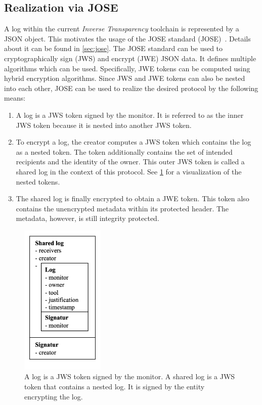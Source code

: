 \documentclass[../main.tex]{subfiles}
\begin{document}
\subsection{Realization via JOSE}
\label{sec:jose-protocol}

A log within the current \emph{Inverse Transparency} toolchain is represented by a JSON object.
This motivates the usage of the JOSE standard (JOSE)~\cite{Barnes2014}.
Details about it can be found in \cref{sec:jose}.
The JOSE standard can be used to cryptographically sign (JWS) and encrypt (JWE) JSON data.
It defines multiple algorithms which can be used.
Specifically, JWE tokens can be computed using hybrid encryption algorithms.
Since JWS and JWE tokens can also be nested into each other, JOSE can be used to realize the desired protocol by the following means:
\begin{enumerate}
    \item 
    A log is a JWS token signed by the monitor.
    It is referred to as the inner JWS token because it is nested into another JWS token.
    \item 
    To encrypt a log, the creator computes a JWS token which contains the log as a nested token.
    The token additionally contains the set of intended recipients and the identity of the owner.
    This outer JWS token is called a shared log in the context of this protocol.
    See \cref{fig:nested-jws} for a visualization of the nested tokens.
    \item
    The shared log is finally encrypted to obtain a JWE token.
    This token also contains the unencrypted metadata within its protected header.
    The metadata, however, is still integrity protected.
\end{enumerate}


\begin{figure}[h!]
    \includegraphics[width=4cm]{../img/05/nested_jws.jpg}
    \centering
    \caption[Nested JWS tokens]{A log is a JWS token signed by the monitor. A shared log is a JWS token that contains a nested log. It is signed by the entity encrypting the log.}
    \label{fig:nested-jws}
\end{figure}
\end{document}
